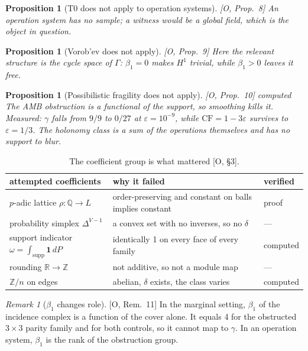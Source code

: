 \documentclass[11pt]{article}
\newtheorem{proposition}[theorem]{Proposition}
\theoremstyle{definition}
\theoremstyle{remark}
\newtheorem{remark}[theorem]{Remark}
\newcommand{\Z}{\mathbb{Z}}
\newcommand{\Q}{\mathbb{Q}}
\newcommand{\R}{\mathbb{R}}
\newcommand{\CF}{\mathrm{CF}}
\newcommand{\one}{\mathbf{1}}
\newcommand{\src}[1]{\textsf{\small[#1]}}
\newcommand{\st}[1]{\textsf{\small\color{gray}#1}}
\begin{document}
\begin{proposition}[T0 does not apply to operation systems]\src{O, Prop.~8} An operation system has no sample; a witness would be a global field, which is the object in question.\end{proposition}
\begin{proposition}[Vorob'ev does not apply]\src{O, Prop.~9} Here the relevant structure is the cycle space of $\Gamma$: $\beta_1=0$ makes $H^1$ trivial, while $\beta_1>0$ leaves it free.\end{proposition}
\begin{proposition}[Possibilistic fragility does not apply]\label{prop:frag}
\src{O, Prop.~10} \st{computed}
The AMB obstruction is a functional of the support, so smoothing kills it. Measured: $\gamma$ falls from $9/9$ to $0/27$ at $\varepsilon=10^{-9}$, while $\CF=1-3\varepsilon$ survives to $\varepsilon=1/3$. The holonomy class is a sum of the operations themselves and has no support to blur.
\end{proposition}

\begin{table}[h]\centering\small
\begin{tabularx}{\linewidth}{@{}l>{\raggedright}X l@{}}
\toprule
attempted coefficients & why it failed & verified\\
\midrule
$p$-adic lattice $\rho:\Q\to L$ & order-preserving and constant on balls implies constant & proof\\
probability simplex $\Delta^{V-1}$ & a convex set with no inverses, so no $\delta$ & ---\\
support indicator $\omega=\int_{\mathrm{supp}}\one\,dP$ & identically 1 on every face of every family & computed\\
rounding $\R\to\Z$ & not additive, so not a module map & ---\\
\midrule
$\Z/n$ on edges & abelian, $\delta$ exists, the class varies & computed\\
\bottomrule
\end{tabularx}
\caption{The coefficient group is what mattered \src{O, \S3}.}
\end{table}
\begin{remark}[$\beta_1$ changes role]\src{O, Rem.~11} In the marginal setting, $\beta_1$ of the incidence complex is a function of the cover alone. It equals 4 for the obstructed $3\times3$ parity family and for both controls, so it cannot map to $\gamma$. In an operation system, $\beta_1$ is the rank of the obstruction group.\end{remark}
\end{document}
